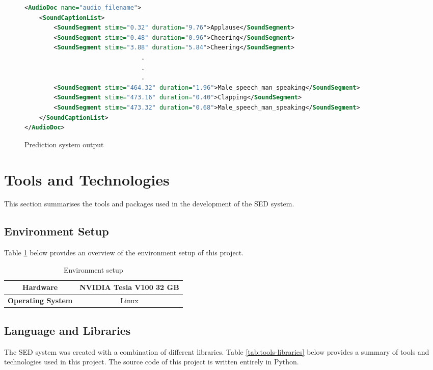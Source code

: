 \begin{figure}[!htb]
    \centering
    \begin{lstlisting}[language=XML]
<AudioDoc name="audio_filename">
    <SoundCaptionList>
        <SoundSegment stime="0.32" duration="9.76">Applause</SoundSegment>
        <SoundSegment stime="0.48" duration="0.96">Cheering</SoundSegment>
        <SoundSegment stime="3.88" duration="5.84">Cheering</SoundSegment>
                                .
                                .
                                .
        <SoundSegment stime="464.32" duration="1.96">Male_speech_man_speaking</SoundSegment>
        <SoundSegment stime="473.16" duration="0.40">Clapping</SoundSegment>
        <SoundSegment stime="473.32" duration="0.68">Male_speech_man_speaking</SoundSegment>
    </SoundCaptionList>
</AudioDoc>
    \end{lstlisting}
    \caption{Prediction system output}
    \label{fig:xml-output}
\end{figure}

\section{Tools and Technologies}
This section summarises the tools and packages used in the development of the SED system.

\subsection{Environment Setup}
Table \ref{tab:env} below provides an overview of the environment setup of this project.

\begin{table}[!htp]
\centering
\begin{tabular}{|c|c|}
\hline
\textbf{Hardware}         & NVIDIA Tesla V100 32 GB \\ \hline
\textbf{Operating System} & Linux                   \\ \hline
\end{tabular}
\caption{\label{tab:env}Environment setup}
\end{table}

\subsection{Language and Libraries}
The SED system was created with a combination of different libraries. Table \ref{tab:tools-libraries} below provides a summary of tools and technologies used in this project. The source code of this project is written entirely in Python.

